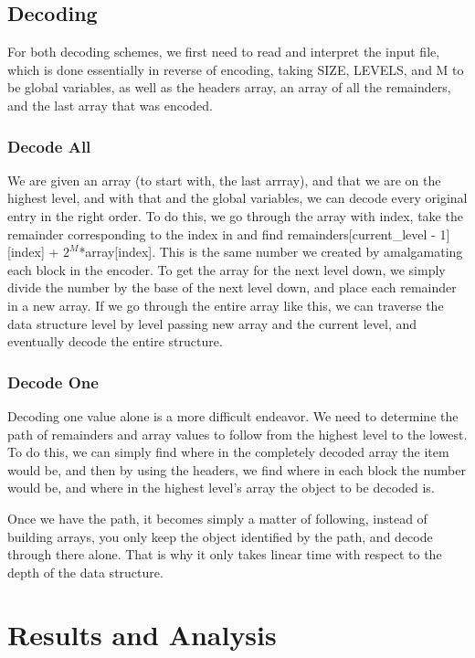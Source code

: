 \documentclass{article}
\begin{document}
\noindent \subsection{Decoding}
For both decoding schemes, we first need to read and interpret the input file, which is done essentially in reverse of encoding, taking SIZE, LEVELS, and M to be global variables, as well as the headers array, an array of all the remainders, and the last array that was encoded.\\

\noindent \subsubsection{Decode All}
We are given an array (to start with, the last arrray), and that we are on the highest level, and with that and the global variables, we can decode every original entry in the right order. To do this, we go through the array with index, take the remainder corresponding to the index in and find remainders[current\_level - 1][index] + $2^M$*array[index]. This is the same number we created by amalgamating each block in the encoder. To get the array for the next level down, we simply divide the number by the base of the next level down, and place each remainder in a new array. If we go through the entire array like this, we can traverse the data structure level by level passing new array and the current level, and eventually decode the entire structure. \\

\noindent \subsubsection{Decode One}
Decoding one value alone is a more difficult endeavor. We need to determine the path of remainders and array values to follow from the highest level to the lowest. 
To do this, we can simply find where in the completely decoded array the item would be, and then by using the headers, we find where in each block the number would be, and where in the highest level's array the object to be decoded is.

Once we have the path, it becomes simply a matter of following, instead of building arrays, you only keep the object identified by the path, and decode through there alone. That is why it only takes linear time with respect to the depth of the data structure.


\bigskip

\noindent \section{Results and Analysis}
\end{document}
